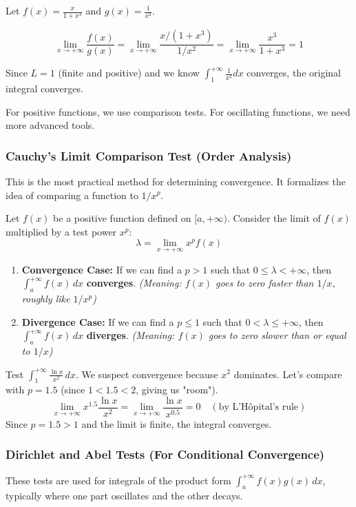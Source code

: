 Let $f(x) = \frac{x}{1+x^3}$ and $g(x) = \frac{1}{x^2}$.

\[
\lim_{x \to +\infty} \frac{f(x)}{g(x)} = \lim_{x \to +\infty} \frac{x/(1+x^3)}{1/x^2} = \lim_{x \to +\infty} \frac{x^3}{1+x^3} = 1
\]

Since $L=1$ (finite and positive) and we know $\int_1^{+\infty} \frac{1}{x^2} dx$ converges, the original integral converges.



For positive functions, we use comparison tests. For oscillating functions, we need more advanced tools.

\subsubsection{Cauchy's Limit Comparison Test (Order Analysis)}
This is the most practical method for determining convergence. It formalizes the idea of comparing a function to $1/x^p$.

\begin{theorem}
Let $f(x)$ be a positive function defined on $[a, +\infty)$. Consider the limit of $f(x)$ multiplied by a test power $x^p$:
\[
\lambda = \lim_{x \to +\infty} x^p f(x)
\]
\begin{enumerate}
    \item \textbf{Convergence Case:} If we can find a $p > 1$ such that $0 \le \lambda < +\infty$, then $\int_a^{+\infty} f(x) \, dx$ \textbf{converges}.
    \textit{(Meaning: $f(x)$ goes to zero faster than $1/x$, roughly like $1/x^p$)}
    
    \item \textbf{Divergence Case:} If we can find a $p \le 1$ such that $0 < \lambda \le +\infty$, then $\int_a^{+\infty} f(x) \, dx$ \textbf{diverges}.
    \textit{(Meaning: $f(x)$ goes to zero slower than or equal to $1/x$)}
\end{enumerate}
\end{theorem}

\begin{example}
Test $\int_1^{+\infty} \frac{\ln x}{x^2} \, dx$.
We suspect convergence because $x^2$ dominates. Let's compare with $p=1.5$ (since $1 < 1.5 < 2$, giving us "room").
\[
\lim_{x \to +\infty} x^{1.5} \frac{\ln x}{x^2} = \lim_{x \to +\infty} \frac{\ln x}{x^{0.5}} = 0 \quad (\text{by L'Hôpital's rule})
\]
Since $p=1.5 > 1$ and the limit is finite, the integral converges.
\end{example}

\subsubsection{Dirichlet and Abel Tests (For Conditional Convergence)}
These tests are used for integrals of the product form $\int_a^{+\infty} f(x)g(x) \, dx$, typically where one part oscillates and the other decays.

